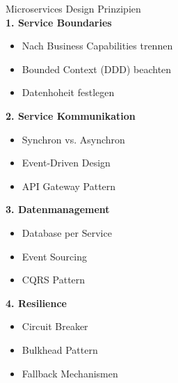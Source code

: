 \begin{KR}{Microservices Design Prinzipien}\\
\textbf{1. Service Boundaries}
\begin{itemize}
    \item Nach Business Capabilities trennen
    \item Bounded Context (DDD) beachten
    \item Datenhoheit festlegen
\end{itemize}

\textbf{2. Service Kommunikation}
\begin{itemize}
    \item Synchron vs. Asynchron
    \item Event-Driven Design
    \item API Gateway Pattern
\end{itemize}

\textbf{3. Datenmanagement}
\begin{itemize}
    \item Database per Service
    \item Event Sourcing
    \item CQRS Pattern
\end{itemize}

\textbf{4. Resilience}
\begin{itemize}
    \item Circuit Breaker
    \item Bulkhead Pattern
    \item Fallback Mechanismen
\end{itemize}
\end{KR}

